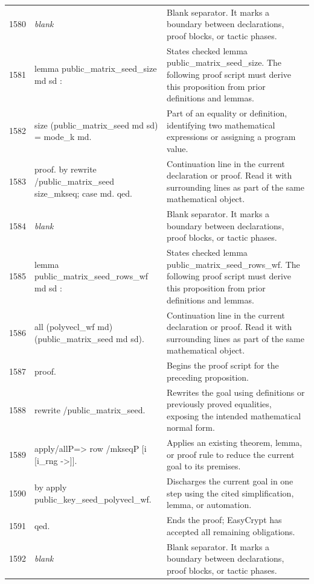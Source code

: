 \documentclass[10pt]{article}
\begin{document}
\begin{longtable}{r L{0.53\textwidth} L{0.37\textwidth}}
1580 & {\ttfamily\scriptsize \emph{blank}} & Blank separator.  It marks a boundary between declarations, proof blocks, or tactic phases. \\
1581 & {\ttfamily\scriptsize lemma public\_matrix\_seed\_size md sd :} & States checked lemma public\_matrix\_seed\_size.  The following proof script must derive this proposition from prior definitions and lemmas. \\
1582 & {\ttfamily\scriptsize   size (public\_matrix\_seed md sd) = mode\_k md.} & Part of an equality or definition, identifying two mathematical expressions or assigning a program value. \\
1583 & {\ttfamily\scriptsize proof. by rewrite /public\_matrix\_seed size\_mkseq; case md. qed.} & Continuation line in the current declaration or proof.  Read it with surrounding lines as part of the same mathematical object. \\
1584 & {\ttfamily\scriptsize \emph{blank}} & Blank separator.  It marks a boundary between declarations, proof blocks, or tactic phases. \\
1585 & {\ttfamily\scriptsize lemma public\_matrix\_seed\_rows\_wf md sd :} & States checked lemma public\_matrix\_seed\_rows\_wf.  The following proof script must derive this proposition from prior definitions and lemmas. \\
1586 & {\ttfamily\scriptsize   all (polyvecl\_wf md) (public\_matrix\_seed md sd).} & Continuation line in the current declaration or proof.  Read it with surrounding lines as part of the same mathematical object. \\
1587 & {\ttfamily\scriptsize proof.} & Begins the proof script for the preceding proposition. \\
1588 & {\ttfamily\scriptsize rewrite /public\_matrix\_seed.} & Rewrites the goal using definitions or previously proved equalities, exposing the intended mathematical normal form. \\
1589 & {\ttfamily\scriptsize apply/allP=> row /mkseqP [i [i\_rng ->]].} & Applies an existing theorem, lemma, or proof rule to reduce the current goal to its premises. \\
1590 & {\ttfamily\scriptsize by apply public\_key\_seed\_polyvecl\_wf.} & Discharges the current goal in one step using the cited simplification, lemma, or automation. \\
1591 & {\ttfamily\scriptsize qed.} & Ends the proof; EasyCrypt has accepted all remaining obligations. \\
1592 & {\ttfamily\scriptsize \emph{blank}} & Blank separator.  It marks a boundary between declarations, proof blocks, or tactic phases. \\

\end{longtable}
\end{document}
